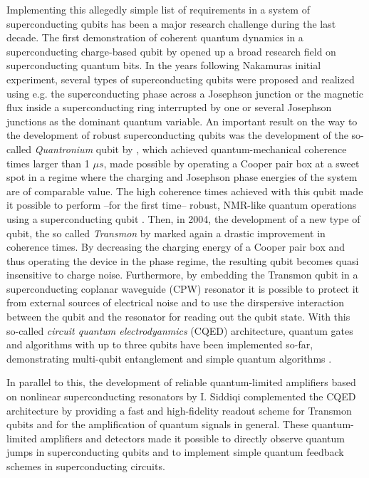 Implementing this allegedly simple list of requirements in a system of superconducting qubits has been a major research challenge during the last decade. The first demonstration of coherent quantum dynamics in a superconducting charge-based qubit by \cite{nakamura_coherent_1999} opened up a broad research field on superconducting quantum bits. In the years following Nakamuras initial experiment, several types of superconducting qubits were proposed and realized using e.g. the superconducting phase \citep{martinis_energy-level_1985,martinis_rabi_2002} across a Josephson junction or the magnetic flux \citep{mooij_josephson_1999,chiorescu_coherent_2003} inside a superconducting ring interrupted by one or several Josephson junctions as the dominant quantum variable. An important result on the way to the development of robust superconducting qubits was the development of the so-called {\it Quantronium} qubit by \cite{vion_manipulating_2002}, which achieved quantum-mechanical coherence times larger than 1 $\mu s$, made possible by operating a Cooper pair box at a sweet spot in a regime where the charging and Josephson phase energies of the system are of comparable value. The high coherence times achieved with this qubit made it possible to perform --for the first time-- robust, NMR-like quantum operations using a superconducting qubit \citep{collin_nmr-like_2004}. Then, in 2004, the development of a new type of qubit, the so called {\it Transmon} by \cite{wallraff_strong_2004} marked again a drastic improvement in coherence times. By decreasing the charging energy of a Cooper pair box and thus operating the device in the phase regime, the resulting qubit becomes quasi insensitive to charge noise. Furthermore, by embedding the Transmon qubit in a superconducting coplanar waveguide (CPW) resonator it is possible to protect it from external sources of electrical noise and to use the dirspersive interaction between the qubit and the resonator for reading out the qubit state\citep{blais_cavity_2004}. With this so-called {\it circuit quantum electrodyanmics} (CQED) architecture, quantum gates and algorithms with up to three qubits have been implemented so-far, demonstrating multi-qubit entanglement \citep{dicarlo_preparation_2010} and simple quantum algorithms \citep{dicarlo_demonstration_2009}.


In parallel to this, the development of reliable quantum-limited amplifiers based on nonlinear superconducting resonators by I. Siddiqi \citep{siddiqi_rf-driven_2004,vijay_invited_2009} complemented the CQED architecture by providing a fast and high-fidelity readout scheme for Transmon qubits \citep{siddiqi_dispersive_2006,mallet_single-shot_2009} and for the amplification of quantum signals in general. These quantum-limited amplifiers and detectors made it possible to directly observe quantum jumps in superconducting qubits \citep{vijay_observation_2011} and to implement simple quantum feedback schemes in superconducting circuits.

